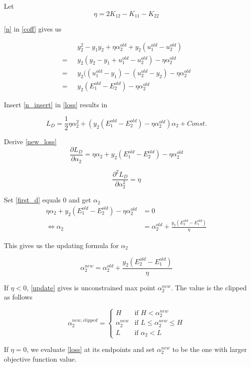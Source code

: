 \documentclass[a4paper]{article}
\begin{document}
Let 
\begin{equation}
\label{n}
\eta = 2K_{12} - K_{11} - K_{22}
\end{equation}

\eqref{n} in \eqref{coff} gives us

\begin{align}
& y_2^2 - y_1y_2 + \eta\alpha_2^{old} + y_2(u_1^{old} - u_2^{old}) \\
=\text{ }& y_2(y_2 - y_1 + u_1^{old} - u_2^{old}) - \eta\alpha_2^{old} \\
=\text{ }& y_2((u_1^{old} - y_1) - ({u_2^{old} - y_2}) - \eta\alpha_2^{old} \\
\label{n_insert}
=\text{ }& y_2(E_1^{old} - E_2^{old}) -\eta\alpha_2^{old}
\end{align}

Insert \eqref{n_insert} in \eqref{loss} results in

\begin{equation}
\label{new_loss}
L_D = \frac{1}{2}\eta\alpha_2^2 + (y_2(E_1^{old} - E_2^{old}) - \eta\alpha_2^{old})\alpha_2 + Const.
\end{equation}

Derive \eqref{new_loss}
\begin{equation}
\label{first_d}
\frac{\partial L_D}{\partial \alpha_2} = \eta\alpha_2 + y_2(E_1^{old} - E_2^{old}) - \eta\alpha_2^{old}
\end{equation}

\begin{equation}
\frac{\partial^2 L_D}{\partial \alpha_2^2} = \eta
\end{equation}

Set \eqref{first_d} equals 0 and get $\alpha_2$
\begin{align}
\eta\alpha_2 + y_2(E_1^{old} - E_2^{old}) - \eta\alpha_2^{old} &= 0 \\
\Leftrightarrow \alpha_2 &= \alpha_2^{old} + \frac{y_2(E_2^{old} - E_1^{old})}{\eta}
\end{align}

This gives us the updating formula for $\alpha_2$

\begin{equation}
\label{update}
\alpha_2^{new} = \alpha_2^{old} + \frac{y_2(E_2^{old} - E_1^{old})}{\eta}
\end{equation}

If $\eta < 0$, \eqref{update} gives is unconstrained max point $\alpha_2^{new}$. The value is the clipped as follows

$$
\alpha_2^{new,clipped} = \begin{cases} 
H &\mbox{if } H < \alpha_2^{new} \\ 
\alpha_2^{new} & \mbox{if } L \le \alpha_2^{new} \le H \\
L &\mbox{if } \alpha_2 < L
\end{cases} 
$$

If $\eta = 0$, we evaluate \eqref{loss} at its endpoints and set $\alpha_2^{new}$ to be the one with larger objective function value.
\end{document}
